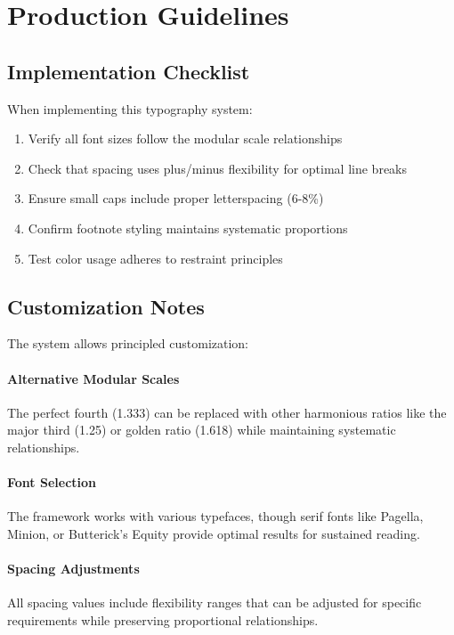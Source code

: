 \documentclass[11pt]{article}
\begin{document}
\section{Production Guidelines}

\subsection{Implementation Checklist}

When implementing this typography system:

\begin{enumerate}
\item Verify all font sizes follow the modular scale relationships
\item Check that spacing uses plus/minus flexibility for optimal line breaks  
\item Ensure small caps include proper letterspacing (6-8\%)
\item Confirm footnote styling maintains systematic proportions
\item Test color usage adheres to restraint principles
\end{enumerate}

\subsection{Customization Notes}

The system allows principled customization:

\paragraph{Alternative Modular Scales} The perfect fourth (1.333) can be replaced with other harmonious ratios like the major third (1.25) or golden ratio (1.618) while maintaining systematic relationships.

\paragraph{Font Selection} The framework works with various typefaces, though serif fonts like Pagella, Minion, or Butterick's Equity provide optimal results for sustained reading.

\paragraph{Spacing Adjustments} All spacing values include flexibility ranges that can be adjusted for specific requirements while preserving proportional relationships.
\end{document}
